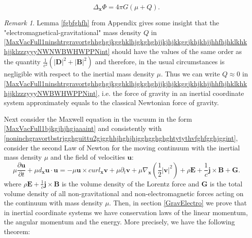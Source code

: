 \documentclass{article}
\theoremstyle{definition}
\theoremstyle{remark}
\newtheorem{remark}{Remark}[section]
\renewcommand{\vec}[1]{\mathbf{#1}}
\newcommand{\er}{\eqref}
\newcommand{\er}{\eqref}
\newtheorem{remark}{Remark}
\begin{document}
\begin{equation}
\label{MaxVacFull1ninshtrgravortghhghgjkgghklhjgkghghjjkjhjkkggjkhjkhjjhhfhjhklkhkhjjklzzzyyyhjggjhgghhjhNWNWNWBWHWPPNint}
\Delta_{\vec x}\Phi=4\pi G(\mu+Q).
\end{equation}
\begin{remark}\label{ghghvghhgggh}
Lemma \ref{fgbfghfh} from Appendix gives some insight that the
"electromagnetical-gravitational" mass density $Q$ in
\er{MaxVacFull1ninshtrgravortghhghgjkgghklhjgkghghjjkjhjkkggjkhjkhjjhhfhjhklkhkhjjklzzzyyyNWNWBWHWPPNint}
should have the values of the same order as the quantity
$\frac{1}{c^2}\left(|\vec D|^2+|\vec B|^2\right)$ and therefore, in
the usual circumstances is negligible with respect to the inertial
mass density $\mu$. Thus we can write $Q\approx 0$ in
\er{MaxVacFull1ninshtrgravortghhghgjkgghklhjgkghghjjkjhjkkggjkhjkhjjhhfhjhklkhkhjjklzzzyyyNWBWHWPPNint},
i.e. the force of gravity in an inertial coordinate system
approximately equals to the classical Newtonian force of gravity.
\end{remark}
Next consider the Maxwell equation in the vacuum in the form
\er{MaxVacFull1bjkgjhjhgjaaaint} and consistently with
\er{noninchgravortbstrjgghguittu2gjgghhjhghjhjgghgghghghtytythvfghfgghjggint},
consider the second Law of Newton for the moving continuum with the
inertial mass density $\mu$ and the field of velocities $\vec u$:
\begin{equation}\label{MaxVacFull1ninshtrgravortghhghgjkgghklhjgkghghjjkjhjkkggjkhjkhjjhhfhjhkjkhbbgjhzzzyyykkknnnNWBWHWPPNint}
\mu\frac{\partial\vec u}{\partial t}+\mu d_{\vec x}\vec u\cdot\vec
u=-\mu\vec u\times curl_{\vec x}\vec v+\mu\partial_{t}\vec
v+\mu\nabla_{\vec x}\left(\frac{1}{2}|\vec v|^2\right)+\rho\vec
E+\frac{1}{c}\vec j\times\vec B+\vec G.
\end{equation}
where $\rho\vec E+\frac{1}{c}\vec j\times\vec B$ is the volume
density of the Lorentz force and $\vec G$ is the total volume
density of all non-gravitational and non-electromagnetic forces
acting on the continuum with mass density $\mu$. Then, in section
\ref{GravElectro} we prove that in inertial coordinate systems we
have conservation laws of the linear momentum, the angular momentum
and the energy. More precisely, we have the following theorem:
\end{document}

